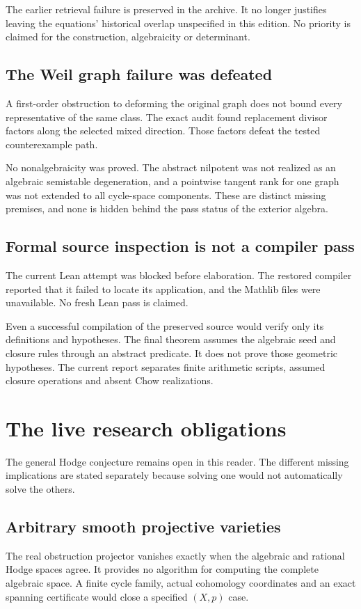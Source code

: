 The earlier retrieval failure is preserved in the archive. It no longer justifies leaving the equations' historical overlap unspecified in this edition. No priority is claimed for the construction, algebraicity or determinant.

\section{The Weil graph failure was defeated}
A first-order obstruction to deforming the original graph does not bound every representative of the same class. The exact audit found replacement divisor factors along the selected mixed direction. Those factors defeat the tested counterexample path.

No nonalgebraicity was proved. The abstract nilpotent was not realized as an algebraic semistable degeneration, and a pointwise tangent rank for one graph was not extended to all cycle-space components. These are distinct missing premises, and none is hidden behind the pass status of the exterior algebra.

\section{Formal source inspection is not a compiler pass}
The current Lean attempt was blocked before elaboration. The restored compiler reported that it failed to locate its application, and the Mathlib files were unavailable. No fresh Lean pass is claimed.

Even a successful compilation of the preserved source would verify only its definitions and hypotheses. The final theorem assumes the algebraic seed and closure rules through an abstract predicate. It does not prove those geometric hypotheses. The current report separates finite arithmetic scripts, assumed closure operations and absent Chow realizations.

\chapter{The live research obligations}
The general Hodge conjecture remains open in this reader. The different missing implications are stated separately because solving one would not automatically solve the others.

\section{Arbitrary smooth projective varieties}
The real obstruction projector vanishes exactly when the algebraic and rational Hodge spaces agree. It provides no algorithm for computing the complete algebraic space. A finite cycle family, actual cohomology coordinates and an exact spanning certificate would close a specified $(X,p)$ case.

